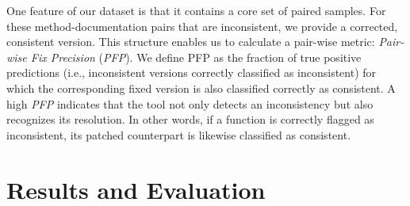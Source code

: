 \documentclass[acmsmall, screen]{acmart}
\begin{document}
One feature of our dataset is that it contains a core set of paired samples. For these method-documentation pairs that are inconsistent, we provide a corrected, consistent version. This structure enables us to calculate a pair-wise metric: \textit{Pair-wise Fix Precision} (\textit{PFP}). We define PFP as the fraction of true positive predictions (i.e., inconsistent versions correctly classified as inconsistent) for which the corresponding fixed version is also classified correctly as consistent.
A high \textit{PFP} indicates that the tool not only detects an inconsistency but also recognizes its resolution. In other words, if a function is correctly flagged as inconsistent, its patched counterpart is likewise classified as consistent. 

\section{Results and Evaluation}
\end{document}
